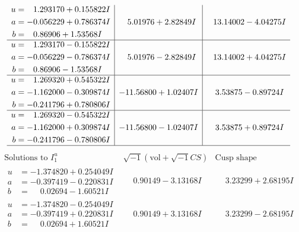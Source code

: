 \documentclass[1p]{elsarticle_modified}
\theoremstyle{definition}
\newcommand{\I}{\sqrt{-1}}
\begin{document}
$$\begin{array}{c|c|c}
\begin{aligned}
u &= \phantom{-}1.293170 + 0.155822 I \\
a &= -0.056229 + 0.786374 I \\
b &= \phantom{-}0.86906 + 1.53568 I\end{aligned}
 & \phantom{-}5.01976 + 2.82849 I & \phantom{-}13.14002 - 4.04275 I \\ \hline\begin{aligned}
u &= \phantom{-}1.293170 - 0.155822 I \\
a &= -0.056229 - 0.786374 I \\
b &= \phantom{-}0.86906 - 1.53568 I\end{aligned}
 & \phantom{-}5.01976 - 2.82849 I & \phantom{-}13.14002 + 4.04275 I \\ \hline\begin{aligned}
u &= \phantom{-}1.269320 + 0.545322 I \\
a &= -1.162000 - 0.309874 I \\
b &= -0.241796 + 0.780806 I\end{aligned}
 & -11.56800 + 1.02407 I & \phantom{-}3.53875 - 0.89724 I \\ \hline\begin{aligned}
u &= \phantom{-}1.269320 - 0.545322 I \\
a &= -1.162000 + 0.309874 I \\
b &= -0.241796 - 0.780806 I\end{aligned}
 & -11.56800 - 1.02407 I & \phantom{-}3.53875 + 0.89724 I\\
 \hline 
 \end{array}$$\newpage$$\begin{array}{c|c|c}  
\text{Solutions to }I^u_{1}& \I (\text{vol} + \sqrt{-1}CS) & \text{Cusp shape}\\
 \hline 
\begin{aligned}
u &= -1.374820 + 0.254049 I \\
a &= -0.397419 - 0.220831 I \\
b &= \phantom{-}0.02694 - 1.60521 I\end{aligned}
 & \phantom{-}0.90149 - 3.13168 I & \phantom{-}3.23299 + 2.68195 I \\ \hline\begin{aligned}
u &= -1.374820 - 0.254049 I \\
a &= -0.397419 + 0.220831 I \\
b &= \phantom{-}0.02694 + 1.60521 I\end{aligned}
 & \phantom{-}0.90149 + 3.13168 I & \phantom{-}3.23299 - 2.68195 I \\ \hline\begin{aligned}

\end{aligned}
\end{array}$$
\end{document}
